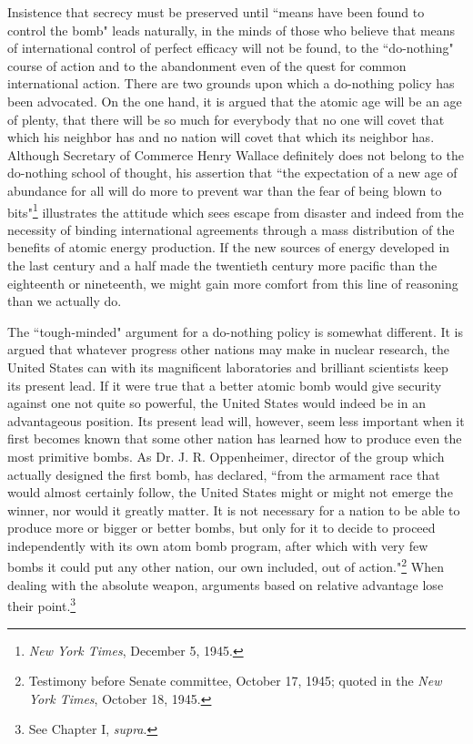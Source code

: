 Insistence that secrecy must be preserved until ``means have been found to control the bomb" leads naturally, in the minds of those who believe that means of international control of perfect efficacy will not be found, to the ``do-nothing" course of action and to the abandonment even of the quest for common international action. There are two grounds upon which a do-nothing policy has been advocated. On the one hand, it is argued that the atomic age will be an age of plenty, that there will be so much for everybody that no one will covet that which his neighbor has and no nation will covet that which its neighbor has. Although Secretary of Commerce Henry Wallace definitely does not belong to the do-nothing school of thought, his assertion that ``the expectation of a new age of abundance for all will do more to prevent war than the fear of being blown to bits"\footnote{\textit{New York Times}, December 5, 1945.} illustrates the attitude which sees escape from disaster and indeed from the necessity of binding international agreements through a mass distribution of the benefits of atomic energy production. If the new sources of energy developed in the last century and a half made the twentieth century more pacific than the eighteenth or nineteenth, we might gain more comfort from this line of reasoning than we actually do.

The ``tough-minded" argument for a do-nothing policy is somewhat different. It is argued that whatever progress other nations may make in nuclear research, the United States can with its magnificent laboratories and brilliant scientists keep its present lead. If it were true that a better atomic bomb would give security against one not quite so powerful, the United States would indeed be in an advantageous position. Its present lead will, however, seem less important when it first becomes known that some other nation has learned how to produce even the most primitive bombs. As Dr. J. R. Oppenheimer, director of the group which actually designed the first bomb, has declared, ``from the armament race that would almost certainly follow, the United States might or might not emerge the winner, nor would it greatly matter. It is not necessary for a nation to be able to produce more or bigger or better bombs, but only for it to decide to proceed independently with its own atom bomb program, after which with very few bombs it could put any other nation, our own included, out of action."\footnote{Testimony before Senate committee, October 17, 1945; quoted in the \textit{New York Times}, October 18, 1945.} When dealing with the absolute weapon, arguments based on relative advantage lose their point.\footnote{See Chapter I, \textit{supra}.}

